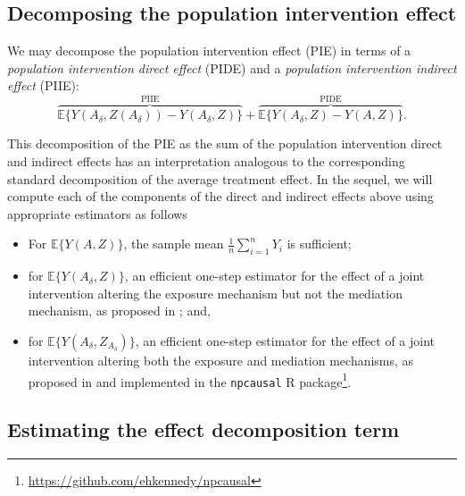 \documentclass[
  12pt,
]{book}
\newcommand{\passthrough}[1]{#1}
\providecommand{\tightlist}{%
  \setlength{\itemsep}{0pt}\setlength{\parskip}{0pt}}
\renewcommand{\href}[2]{#2\footnote{\url{#1}}}
\theoremstyle{definition}
\theoremstyle{definition}
\theoremstyle{definition}
\newcommand{\1}{\mathbbm{1}}
\begin{document}
\hypertarget{decomposing-the-population-intervention-effect}{%
\subsection{Decomposing the population intervention effect}\label{decomposing-the-population-intervention-effect}}

We may decompose the population intervention effect (PIE) in terms of a
\emph{population intervention direct effect} (PIDE) and a \emph{population
intervention indirect effect} (PIIE):
\begin{equation*}
  \overbrace{\mathbb{E}\{Y(A_\delta, Z(A_\delta)) -
    Y(A_\delta, Z)\}}^{\text{PIIE}} +
    \overbrace{\mathbb{E}\{Y(A_\delta, Z) - Y(A, Z)\}}^{\text{PIDE}}.
\end{equation*}

This decomposition of the PIE as the sum of the population intervention direct
and indirect effects has an interpretation analogous to the corresponding
standard decomposition of the average treatment effect. In the sequel, we will
compute each of the components of the direct and indirect effects above using
appropriate estimators as follows

\begin{itemize}
\tightlist
\item
  For \(\mathbb{E}\{Y(A, Z)\}\), the sample mean \(\frac{1}{n}\sum_{i=1}^n Y_i\) is
  sufficient;
\item
  for \(\mathbb{E}\{Y(A_{\delta}, Z)\}\), an efficient one-step estimator for the
  effect of a joint intervention altering the exposure mechanism but not the
  mediation mechanism, as proposed in \citet{diaz2020causal}; and,
\item
  for \(\mathbb{E}\{Y(A_{\delta}, Z_{A_{\delta}})\}\), an efficient one-step
  estimator for the effect of a joint intervention altering both the exposure
  and mediation mechanisms, as proposed in \citet{kennedy2017nonparametric} and
  implemented in the \href{https://github.com/ehkennedy/npcausal}{\passthrough{\lstinline!npcausal!} R
  package}.
\end{itemize}

\hypertarget{estimating-the-effect-decomposition-term}{%
\subsection{Estimating the effect decomposition term}\label{estimating-the-effect-decomposition-term}}
\end{document}
